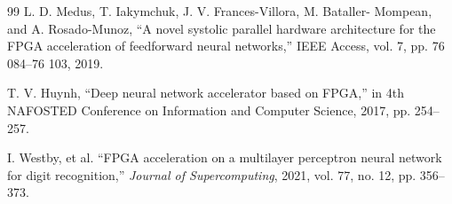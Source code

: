 \begin{thebibliography}{99}
      L. D. Medus, T. Iakymchuk, J. V. Frances-Villora, M. Bataller-
    Mompean, and A. Rosado-Munoz, “A novel systolic parallel hardware
    architecture for the FPGA acceleration of feedforward neural networks,”
    IEEE Access, vol. 7, pp. 76 084–76 103, 2019.
    
     T. V. Huynh, “Deep neural network accelerator based on FPGA,” in 4th NAFOSTED Conference on Information and Computer Science, 2017, pp. 254--257.
    
     I. Westby, et al. “FPGA acceleration on a multilayer perceptron neural network for digit recognition,” \textit{Journal of Supercomputing}, 2021, vol. 77, no. 12, pp. 356--373.
    
\end{thebibliography}
